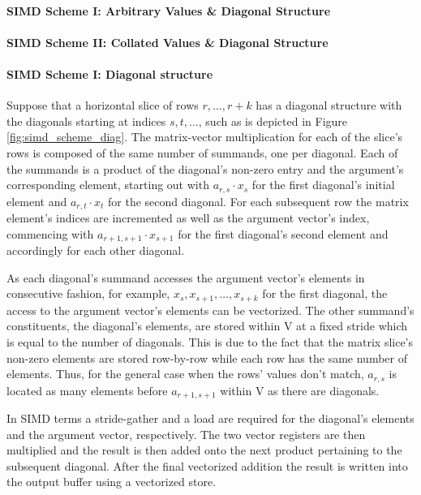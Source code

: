 
        \paragraph{SIMD Scheme I: Arbitrary Values \& Diagonal Structure}

        \paragraph{SIMD Scheme II: Collated Values \& Diagonal Structure}


        \paragraph{SIMD Scheme I: Diagonal structure}

        Suppose that a horizontal slice of rows $r, \ldots, r+k$ has a diagonal structure with the diagonals starting at
        indices $s, t, \ldots $, such as is depicted in Figure \ref{fig:simd_scheme_diag}. The matrix-vector
        multiplication for each of the slice's rows is composed of the same number of summands, one per diagonal. Each
        of the summands is a product of the diagonal's non-zero entry and the argument's corresponding element, starting
        out with $a_{r,s} \cdot x_s$ for the first diagonal's initial element and $a_{r,t} \cdot x_t$ for the second
        diagonal.  For each subsequent row the matrix element's indices are incremented as well as the argument vector's
        index, commencing with $a_{r+1, s+1} \cdot x_{s+1}$ for the first diagonal's second element and accordingly for
        each other diagonal.

      As each diagonal's summand accesses the argument vector's elements in consecutive fashion, for example, $x_s,
      x_{s+1}, \ldots, x_{s + k}$ for the first diagonal, the access to the argument vector's elements can be
      vectorized. The other summand's constituents, the diagonal's elements, are stored within V at a fixed stride which
      is equal to the number of diagonals. This is due to the fact that the matrix slice's non-zero elements are stored
      row-by-row while each row has the same number of elements. Thus, for the general case when the rows' values don't
      match, $a_{r, s}$ is located as many elements before $a_{r+1, s+1}$ within V as there are diagonals.

      In SIMD terms a stride-gather and a load are required for the diagonal's elements and the argument vector,
      respectively. The two vector registers are then multiplied and the result is then added onto the next product
      pertaining to the subsequent diagonal. After the final vectorized addition the result is written into the output
      buffer using a vectorized store.

